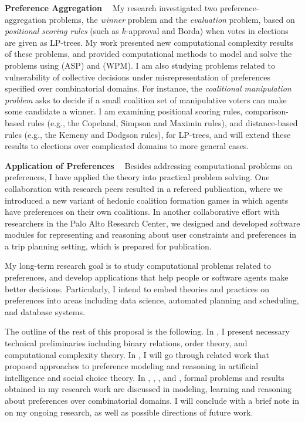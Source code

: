 \smallskip \noindent \textbf{Preference Aggregation  \ }
My research investigated two preference-aggregation 
problems, the \emph{winner} problem and the \emph{evaluation} problem,
based on \textit{positional scoring rules} (such as $k$-approval and Borda) 
when votes in elections are given as LP-trees\cite{abs/ijcai13dc/Liu,conf/adt13/LiuT}. 
My work presented new computational complexity results of these problems, and
provided computational methods to model and solve the problems using
 (ASP) and  (WPM).
I am also studying problems related to vulnerability of collective decisions under 
misrepresentation of preferences specified over combinatorial domains.
For instance, the \textit{coalitional manipulation problem}
asks to decide if a small coalition set of manipulative
voters can make some candidate a winner.
I am examining positional scoring rules,
comparison-based rules (e.g., the Copeland, Simpson and Maximin rules), and 
distance-based rules (e.g., the Kemeny and Dodgson rules), for LP-trees,
and will extend these results to elections over complicated domains to more general cases.

\smallskip \noindent \textbf{Application of Preferences  \ }
Besides addressing computational problems on preferences,
I have applied the theory into practical problem solving.
One collaboration with research peers resulted in a refereed publication\cite{conf/adt13/Spradling},
where we introduced a new variant of hedonic coalition formation games in which agents 
have preferences on their own coalitions.
In another collaborative effort with researchers in the Palo Alto Research Center,
we designed and developed software modules for representing and reasoning about user 
constraints and preferences in a trip planning setting, which is prepared
for publication.

My long-term research goal is to study computational problems related to preferences, and 
develop applications that help people or software agents make better decisions.
Particularly, I intend to embed theories and practices on preferences into areas including
data science, automated planning and scheduling, and database systems.

The outline of the rest of this proposal is the following. 
In , I present necessary technical preliminaries
including binary relations, order theory, and computational complexity theory.
In , I will go through related work that proposed
approaches to preference modeling and reasoning
in artificial intelligence and social choice theory.
In ,  , , and ,
formal problems and results obtained in my research work are discussed
in modeling, learning and reasoning about preferences over combinatorial domains.
I will conclude with a brief note in  on my ongoing research,
as well as possible directions of future work.
